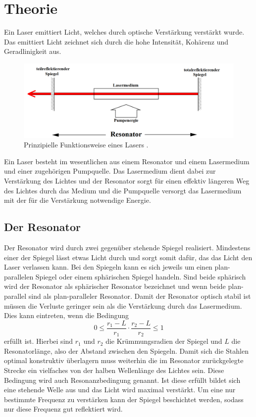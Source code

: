 
\section{Theorie}
\label{sec:Theorie}

Ein Laser emittiert Licht, welches durch optische Verstärkung verstärkt wurde. Das emittiert Licht zeichnet sich durch die hohe Intensität, Kohärenz und Geradlinigkeit aus.

\begin{figure}
	\centering
	\includegraphics[width=\linewidth-100pt,height=\textheight-100pt,keepaspectratio]{content/Images/schema.png}
	\caption{Prinzipielle Funktionsweise eines Lasers \cite{V61}.}
\end{figure}
Ein Laser besteht im wesentlichen aus einem Resonator und einem Lasermedium und einer zugehörigen Pumpquelle. Das Lasermedium dient dabei zur Verstärkung des Lichtes und der Resonator sorgt für einen effektiv längeren Weg des Lichtes durch das Medium und die Pumpquelle versorgt das Lasermedium mit der für die Verstärkung notwendige Energie. 

\subsection{Der Resonator}
Der Resonator wird durch zwei gegenüber stehende Spiegel realisiert. Mindestens einer der Spiegel lässt etwas Licht durch und sorgt somit dafür, das das Licht den Laser verlassen kann. Bei den Spiegeln kann es sich jeweils um einen plan-parallelen Spiegel oder einem sphärischen Spiegel handeln. Sind beide sphärisch wird der Resonator als sphärischer Resonator bezeichnet und wenn beide plan-parallel sind als plan-paralleler Resonator. Damit der Resonator optisch stabil ist müssen die Verluste geringer sein als die Verstärkung durch das Lasermedium. Dies kann eintreten, wenn die Bedingung
\begin{equation}
	0 \leq \frac{r_1 -L}{r_1} \cdot \frac{r_2 -L}{r_2} \leq 1 \label{eq:stabil}
\end{equation}
erfüllt ist. Hierbei sind $r_1$ und $r_2$ die Krümmungsradien der Spiegel und $L$ die Resonatorlänge, also der Abstand zwischen den Spiegeln. Damit sich die Stahlen optimal konstruktiv überlagern muss weiterhin die im Resonator zurückgelegte Strecke ein vielfaches von der halben Wellenlänge des Lichtes sein. Diese Bedingung wird auch Resonanzbedingung genannt. Ist diese erfüllt bildet sich eine stehende Welle aus und das Licht wird maximal verstärkt. Um eine nur bestimmte Frequenz zu verstärken kann der Spiegel beschichtet werden, sodass nur diese Frequenz gut reflektiert wird.

